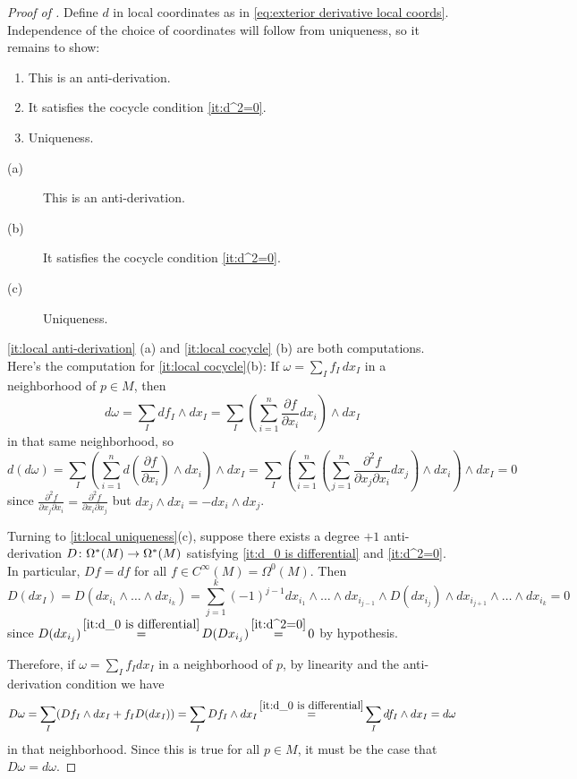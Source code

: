 \begin{proof}[Proof of ]
	Define $d$ in local coordinates as in \eqref{eq:exterior derivative local coords}. Independence of the choice of coordinates will follow from uniqueness, so it remains to show:
	\ifpdf
		\begin{enumerate}[label=(\alph*)]
			\item \label{it:local anti-derivation} This is an anti-derivation.
			\item \label{it:local cocycle} It satisfies the cocycle condition \ref{it:d^2=0}.
			\item \label{it:local uniqueness} Uniqueness.
		\end{enumerate}
		
	\else
		\begin{description}
			\item [(a)\label{it:local anti-derivation}] This is an anti-derivation.
			\item [(b)\label{it:local cocycle}] It satisfies the cocycle condition \ref{it:d^2=0}.
			\item [(c)\label{it:local uniqueness}] Uniqueness.
		\end{description}
	\fi
	
	\ifpdf\ref{it:local anti-derivation} \else (a) \fi and \ifpdf\ref{it:local cocycle} \else (b) \fi are both computations. Here's the computation for \ifpdf\ref{it:local cocycle}\else (b)\fi: If $\omega = \sum_I f_I\, dx_I$ in a neighborhood of $p \in M$, then 
	\[
		d\omega = \sum_I df_I \wedge dx_I = \sum_I \left( \sum_{i=1}^n \frac{\partial f}{\partial x_i} dx_i\right) \wedge dx_I
	\]
	in that same neighborhood, so
	\[
		d(d\omega) = \sum_I \left( \sum_{i=1}^n d\left(\frac{\partial f}{\partial x_i}\right) \wedge dx_i\right) \wedge dx_I = \sum_I \left( \sum_{i=1}^n \left(\sum_{j=1}^n\frac{\partial^2 f}{\partial x_j\partial x_i} dx_j\right) \wedge dx_i\right) \wedge dx_I = 0
	\]
	since $\frac{\partial^2 f}{\partial x_j\partial x_i} = \frac{\partial^2 f}{\partial x_i\partial x_j}$ but $dx_j \wedge dx_i = - dx_i \wedge dx_j$.
	
	Turning to \ifpdf\ref{it:local uniqueness}\else (c)\fi, suppose there exists a degree $+1$ anti-derivation $D\colon\thinspace\! \Omega^\ast(M) \to \Omega^\ast(M)$ satisfying \ref{it:d_0 is differential} and \ref{it:d^2=0}. In particular, $Df = df$ for all $f \in C^\infty(M) = \Omega^0(M)$. Then
	\[
		D(dx_I) = D(dx_{i_1} \wedge \dots \wedge dx_{i_k}) = \sum_{j=1}^k (-1)^{j-1} dx_{i_1} \wedge \dots \wedge dx_{i_{j-1}} \wedge D(dx_{i_j}) \wedge dx_{i_{j+1}} \wedge \dots \wedge dx_{i_k} = 0
	\]
	since $\displaystyle D(dx_{i_j}) \mathop{=}\limits^{\ref{it:d_0 is differential}} D(Dx_{i_j}) \mathop{=}\limits^{\ref{it:d^2=0}} 0$ by hypothesis.
	
	Therefore, if $\omega = \sum_I f_I dx_I$ in a neighborhood of $p$, by linearity and the anti-derivation condition we have
	\[
		D\omega = \sum_I (Df_I \wedge dx_I + f_I D(dx_I)) = \sum_I Df_I \wedge dx_I \mathop{=}^{\ref{it:d_0 is differential}} \sum_I df_I \wedge dx_I = d\omega
	\]
	in that neighborhood. Since this is true for all $p \in M$, it must be the case that $D\omega = d\omega$.
\end{proof}

